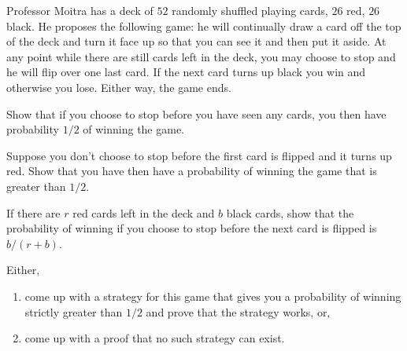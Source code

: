 \documentclass[12pt,twoside]{article}
\begin{document}
\begin{problem}{20}

  Professor Moitra has a deck of $52$ randomly shuffled playing cards, $26$ red, $26$ black.  He proposes the following game: he will continually draw a card off the top of the deck and turn it face up so that you can see it and then put it aside.  At any point while there are still cards left in the deck, you may choose to stop and he will flip over one last card.  If the next card turns up black you win and otherwise you lose.  Either way, the game ends.

\bparts

 Show that if you choose to stop before you have seen any
cards, you then have probability $1/2$ of winning the game.


 Suppose you don't choose to stop before the first card is flipped and it turns up red. Show that you have then have a probability of winning the game that is
greater than $1/2$.


 If there are $r$ red cards left in the deck and $b$ black
cards, show that the probability of winning if you choose to stop before the next card
is flipped is $b/(r+b)$.



 Either,
\begin{enumerate}
\item come up with a strategy for this game that gives you a
  probability of winning strictly greater than $1/2$ and prove that
  the strategy works, or,
\item come up with a proof that no such strategy can exist.
\end{enumerate}


\end{problem}
\end{document}
